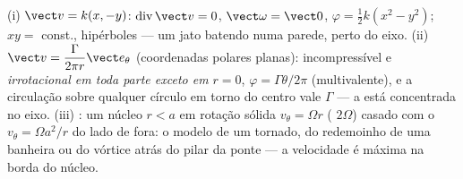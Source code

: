 \begin{example}\label{ex:b2:fluid-kinematics:planeflows}
(i) \emph{} $\vect v = k(x, -y)$: $\operatorname{div}\vect v =
0$, $\vect\omega = \vect 0$, $\varphi = \tfrac12k(x^2 - y^2)$; 
$xy = $ const., hipérboles --- um jato batendo numa parede, perto do eixo. (ii)
\emph{} $\vect v = \dfrac{\Gamma}{2\pi r}\vect e_\theta$ (coordenadas
polares planas): incompressível e \emph{irrotacional em toda parte
exceto em $r = 0$}, $\varphi = \Gamma\theta/2\pi$ (multivalente), e a
circulação sobre qualquer círculo em torno do centro vale $\Gamma$ --- a
 está concentrada no eixo. (iii) \emph{}: um
núcleo $r < a$ em rotação sólida $v_\theta = \Omega r$ ( $2\Omega$)
casado com o  $v_\theta = \Omega a^2/r$ do lado de fora: o modelo de
um tornado, do redemoinho de uma banheira ou do vórtice atrás do pilar da ponte --- a
velocidade é máxima na borda do núcleo.
\end{example}

